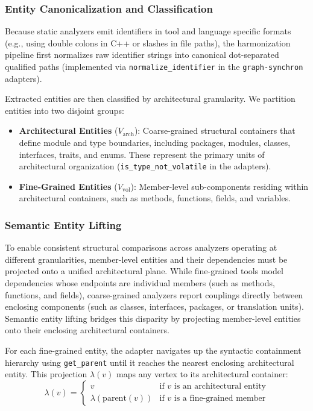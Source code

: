 \subsubsection{Entity Canonicalization and Classification}
\label{subsec:entity_canonicalization}

Because static analyzers emit identifiers in tool and
language specific formats (e.g., using double colons in C++ or
slashes in file paths), the harmonization pipeline first normalizes
raw identifier strings into canonical dot-separated qualified paths
(implemented via \texttt{normalize\_identifier} in the
\texttt{graph-synchron} adapters).

Extracted entities are then classified by architectural granularity.
We partition entities into two disjoint groups:
\begin{itemize}
  \item \textbf{Architectural Entities} ($V_{\text{arch}}$):
    Coarse-grained structural containers that define module and type
    boundaries, including packages, modules, classes, interfaces,
    traits, and enums. These represent the primary units of
    architectural organization (\texttt{is\_type\_not\_volatile} in
    the adapters).
  \item \textbf{Fine-Grained Entities} ($V_{\text{vol}}$): Member-level
    sub-components residing within architectural containers, such as
    methods, functions, fields, and variables.
\end{itemize}

\subsubsection{Semantic Entity Lifting}
\label{subsec:semantic_lifting}

To enable consistent structural comparisons across analyzers operating
at different granularities, member-level entities and their dependencies
must be projected onto a unified architectural plane. While fine-grained
tools model dependencies whose endpoints are individual members (such as
methods, functions, and fields), coarse-grained analyzers report couplings
directly between enclosing components (such as classes, interfaces,
packages, or translation units). Semantic entity lifting bridges this
disparity by projecting member-level entities onto their enclosing
architectural containers.

For each fine-grained entity, the adapter navigates up the syntactic
containment hierarchy using \texttt{get\_parent} until it reaches the
nearest enclosing architectural entity. This projection $\lambda(v)$
maps any vertex to its architectural container:
\begin{equation}
  \lambda(v) =
  \begin{cases}
    v & \text{if } v \text{ is an architectural entity} \\
    \lambda(\text{parent}(v)) & \text{if } v \text{ is a fine-grained member}
  \end{cases}
\end{equation}


